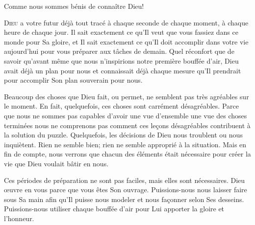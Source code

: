 Comme nous sommes bénis de connaître Dieu!

\dvrule







\lettrine{D}{ieu} a votre futur déjà tout tracé
 \ocadr à chaque seconde de chaque moment, à chaque heure de chaque jour.
 Il sait exactement ce qu'Il veut que vous fassiez dans ce monde pour
 Sa gloire, et Il sait exactement ce qu'Il doit accomplir
 dans votre vie aujourd'hui pour vous préparer aux tâches de demain.
 Quel réconfort que de savoir qu'avant même que nous n'inspirions
 notre première bouffée d'air, Dieu avait déjà un plan pour nous
 et connaissait déjà chaque mesure qu'Il prendrait pour accomplir
 Son plan souverain pour nous.


Beaucoup des choses que Dieu fait, ou permet, ne semblent pas très agréables
 sur le moment. En fait, quelquefois, ces choses sont carrément
 désagréables. Parce que nous ne sommes pas capables d'avoir une vue
 d'ensemble \ocadr une vue des choses terminées \fcadr{} nous ne comprenons
 pas comment ces le\c{c}ons désagréables contribuent à la solution du puzzle.
 Quelquefois, les décisions de Dieu nous troublent ou nous inquiètent.
 Rien ne semble bien; rien ne semble approprié à la situation.
 Mais en fin de compte, nous verrons que chacun des éléments
 était nécessaire pour créer la vie que Dieu voulait bâtir en nous.

Ces périodes de préparation ne sont pas faciles,
 mais elles sont nécessaires. Dieu \oe{}uvre en vous parce que vous êtes
 Son ouvrage. Puissions-nous nous laisser faire sous Sa main
 afin qu'Il puisse nous modeler et nous fa\c{c}onner selon Ses desseins.
 Puissions-nous utiliser chaque bouffée d'air pour Lui apporter
 la gloire et l'honneur.

